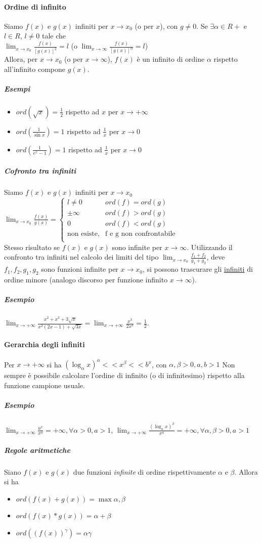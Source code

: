 \paragraph{Ordine di infinito}
Siamo $f(x)$ e $g(x)$ infiniti per $x\to x_0$ (o per $x$), con $g\neq 0$. Se $\exists\alpha\in R+$ e $l\in R$, $l\neq 0$ tale che\\
$\lim_{x\to x_0}\frac{f(x)}{[g(x)]^2}=l$ (o $\lim_{x\to \infty}\frac{f(x)}{[g(x)]^\alpha}=l$)\\
Allora, per $x\to x_0$ (o per $x\to \infty$), $f(x)$ è un infinito di ordine $\alpha$ rispetto all'infinito compone $g(x)$.
\subparagraph{Esempi}
\begin{itemize}
	\item $ord(\sqrt{x})=\frac{1}{2}$ rispetto ad $x$ per $x\to +\infty$
	\item $ord(\frac{1}{\sin x})=1$ rispetto ad $\frac{1}{x}$ per $x\to 0$
	\item $ord(\frac{1}{e^x-1})=1$ rispetto ad $\frac{1}{x}$ per $x\to 0$
\end{itemize}
\subparagraph{Cofronto tra infiniti}
Siamo $f(x)$ e $g(x)$ infiniti per $x\to x_0$\\
$\lim_{x\to x_0}\frac{f(x)}{g(x)}=\begin{cases}
l\neq 0&ord(f)=ord(g)\\
\pm \infty&ord(f)>ord(g)\\
0&ord(f)<ord(g)\\
	\text{non esiste,} & \text{f e g non confrontabile} \\ 
\end{cases}
$\\
Stesso risultato se $f(x)$ e $g(x)$ sono infinite per $x \to \infty$. Utilizzando il confronto tra infiniti nel calcolo dei limiti del tipo $\lim_{x\to x_0}\frac{f_1+f_2}{g_1+g_2}$, deve $f_1,f_2,g_1,g_2$ sono funzioni infinite per $x\to x_0$, si possono {\color{red}trascurare gli \underline{infiniti} di ordine minore} (analogo discorso per funzione infinito $x\to \infty$).
\subparagraph{Esempio}
$\lim_{x\to +\infty}\frac{x^2+x^3+3\sqrt{x}}{x^2(2x-1)+\sqrt{3x}}=\lim_{x\to +\infty}\frac{x^3}{2x^3}=\frac{1}{2}$.
\paragraph{Gerarchia degli infiniti}
Per $x\to +\infty$ si ha $(\log_\alpha x)^\alpha<<x^\beta<<b^x$, con $\alpha,\beta>0,a,b>1$ Non sempre è possibile calcolare l'ordine di infinito (o di infinitesimo) rispetto alla funzione campione usuale.\\
\subparagraph{Esempio}
$\lim_{x\to +\infty}\frac{a^x}{x^a}=+\infty, \forall \alpha>0, a>1$, $\lim_{x\to +\infty}\frac{(\log_a x)^\beta}{x^a}=+\infty, \forall \alpha, \beta>0, a>1$
\subparagraph{Regole aritmetiche}
Siano $f(x)$ e $g(x)$ due funzioni \emph{infinite} di ordine rispettivamente $\alpha$ e $\beta$. Allora si ha
\begin{itemize}
	\item $ord(f(x)+g(x))=\max{\alpha,\beta}$
	\item $ord(f(x)*g(x))=\alpha+\beta$
	\item $ord((f(x))^\gamma)=\alpha\gamma$
\end{itemize}
